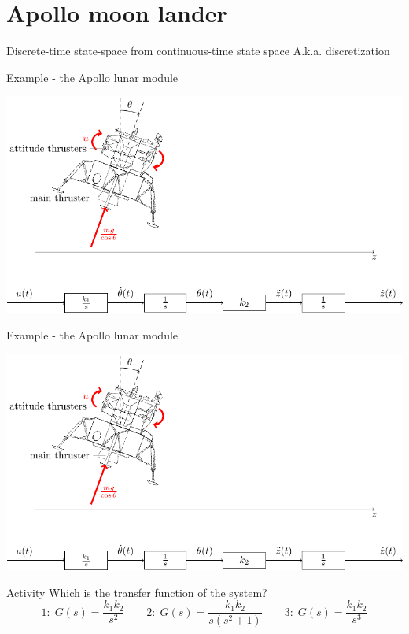 \documentclass[presentation,aspectratio=1610]{beamer}
\begin{document}
\section{Apollo moon lander}
\label{sec:orgcf9afff}
\begin{frame}[label={sec:orgde33206}]{Discrete-time state-space  from continuous-time state space}
A.k.a. discretization
\end{frame}

\begin{frame}[label={sec:org884f995}]{Example - the Apollo lunar module}
\begin{center}
\includegraphics[width=\linewidth]{fig-apollo}
\end{center}
\end{frame}
\begin{frame}[label={sec:org88a3e4a}]{Example - the Apollo lunar module}
\begin{center}
\includegraphics[width=0.8\linewidth]{fig-apollo}
\end{center}
\alert{Activity} Which is the transfer function of the system?
\[1: \; G(s) = \frac{k_1 k_2}{s^2}\qquad 2: \; G(s) = \frac{k_1 k_2}{s(s^2 + 1)} \qquad 3: \; G(s) = \frac{k_1 k_2}{s^3}\]
\end{frame}
\end{document}
